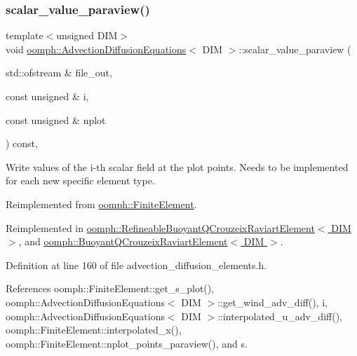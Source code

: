 \subsubsection{\texorpdfstring{scalar\+\_\+value\+\_\+paraview()}{scalar\_value\_paraview()}}
{\footnotesize\ttfamily template$<$unsigned D\+IM$>$ \\
void \hyperlink{classoomph_1_1AdvectionDiffusionEquations}{oomph\+::\+Advection\+Diffusion\+Equations}$<$ D\+IM $>$\+::scalar\+\_\+value\+\_\+paraview (\begin{DoxyParamCaption}\item[{std\+::ofstream \&}]{file\+\_\+out,  }\item[{const unsigned \&}]{i,  }\item[{const unsigned \&}]{nplot }\end{DoxyParamCaption}) const\hspace{0.3cm}{\ttfamily [inline]}, {\ttfamily [virtual]}}



Write values of the i-\/th scalar field at the plot points. Needs to be implemented for each new specific element type. 



Reimplemented from \hyperlink{classoomph_1_1FiniteElement_a02cf8832a5e2886f1572bd36f7a7c1e3}{oomph\+::\+Finite\+Element}.



Reimplemented in \hyperlink{classoomph_1_1RefineableBuoyantQCrouzeixRaviartElement_a9a8ee12b27daa327e97fbacc89c341c6}{oomph\+::\+Refineable\+Buoyant\+Q\+Crouzeix\+Raviart\+Element$<$ D\+I\+M $>$}, and \hyperlink{classoomph_1_1BuoyantQCrouzeixRaviartElement_a33130eacdbdee41536fce76166c4a769}{oomph\+::\+Buoyant\+Q\+Crouzeix\+Raviart\+Element$<$ D\+I\+M $>$}.



Definition at line 160 of file advection\+\_\+diffusion\+\_\+elements.\+h.



References oomph\+::\+Finite\+Element\+::get\+\_\+s\+\_\+plot(), oomph\+::\+Advection\+Diffusion\+Equations$<$ D\+I\+M $>$\+::get\+\_\+wind\+\_\+adv\+\_\+diff(), i, oomph\+::\+Advection\+Diffusion\+Equations$<$ D\+I\+M $>$\+::interpolated\+\_\+u\+\_\+adv\+\_\+diff(), oomph\+::\+Finite\+Element\+::interpolated\+\_\+x(), oomph\+::\+Finite\+Element\+::nplot\+\_\+points\+\_\+paraview(), and s.

\mbox{\label{classoomph_1_1AdvectionDiffusionEquations_ac9f27a62a29a9c3c850505f4cb9c00b7}} 
